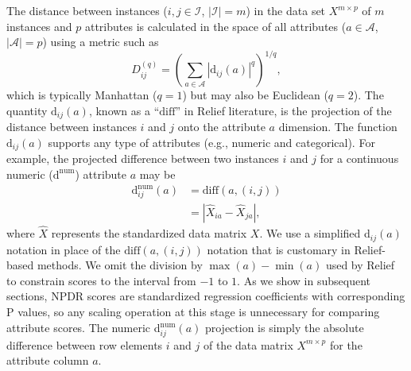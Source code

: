 \documentclass[10pt,letterpaper]{article}\usepackage[]{graphicx}\usepackage[]{color}
\def\ri{R_i}
\def\rj{R_j}
\begin{document}
The distance between instances ($i,j \in \mathcal{I}$, $|\mathcal{I}|=m$) in the data set $X^{m \times p}$ of $m$ instances and $p$ attributes is calculated in the space of all attributes ($a \in \mathcal{A}$, $|\mathcal{A}|=p$) using a metric such as
\begin{equation}\label{eq:D}
D^{(q)}_{ij}=\left(\sum_{a\in \mathcal{A}}|\text{d}_{ij}(a)|^q\right)^{1/q},
\end{equation}
%
which is typically Manhattan ($q=1$) but may also be Euclidean ($q=2$). The quantity 
$\text{d}_{ij}(a)$,
known as a ``$\text{diff}$'' in Relief literature, is the projection of the distance between instances $i$ and $j$ onto the attribute $a$ dimension. The 
function $\text{d}_{ij}(a)$ supports any type of attributes
(e.g., numeric and categorical).
For example, the projected difference between two instances $i$ and $j$ for a continuous numeric ($\text{d}^{\text{num}}$) attribute $a$ may be
\begin{equation}\label{eq:diff}
\begin{aligned}
\text{d}^{\text{num}}_{ij}(a)&=\text{diff}(a,(i,j))\\
                                            & = {|\hat{X}_{ia}-\hat{X}_{ja}|},
\end{aligned}
\end{equation}
where $\hat{X}$ represents the standardized data matrix $X$.
We use a simplified d$_{ij}(a)$ notation in place of the $\text{diff}(a,(i,j))$ notation that is customary in Relief-based methods.
We omit the division by $\max(a)-\min(a)$ used by Relief to constrain scores to the interval from $-1$ to $1$.
As we show in subsequent sections, NPDR scores are standardized regression coefficients with corresponding P values, so any scaling operation at this stage is unnecessary for comparing attribute scores. 
The numeric d$^{\text{num}}_{ij}(a)$ projection is simply the absolute difference between row elements $i$ and $j$ of the data matrix $X^{m \times p}$ for the attribute column $a$. 
\end{document}

